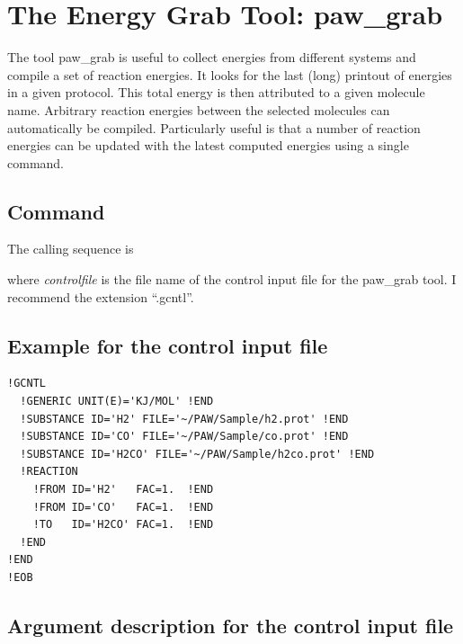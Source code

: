 \documentclass[final,12pt,makeidx,DIV=calc]{article}
\begin{document}
{{{{{{%
\newpage
\section{The Energy Grab Tool: paw\_grab}
The tool paw\_grab is useful to collect energies from different
systems and compile a set of reaction energies. It looks for the last
(long) printout of energies in a given protocol. This total energy is
then attributed to a given molecule name. Arbitrary reaction energies
between the selected molecules can automatically be
compiled. Particularly useful is that a number of reaction energies can be
updated with the latest computed energies using a single command.


\subsection{Command}

The calling sequence is

\bigskip{}\bigskip

\noindent 
where {\it controlfile} is the file name of the control input file for
the paw\_grab tool. I recommend the extension ``.gcntl''.

\subsection{Example for the control input file}

\begin{verbatim}
!GCNTL
  !GENERIC UNIT(E)='KJ/MOL' !END
  !SUBSTANCE ID='H2' FILE='~/PAW/Sample/h2.prot' !END
  !SUBSTANCE ID='CO' FILE='~/PAW/Sample/co.prot' !END
  !SUBSTANCE ID='H2CO' FILE='~/PAW/Sample/h2co.prot' !END
  !REACTION 
    !FROM ID='H2'   FAC=1.  !END
    !FROM ID='CO'   FAC=1.  !END
    !TO   ID='H2CO' FAC=1.  !END
  !END
!END
!EOB  
\end{verbatim}

\subsection{Argument description for the control input file}

}}}}}}
\end{document}

